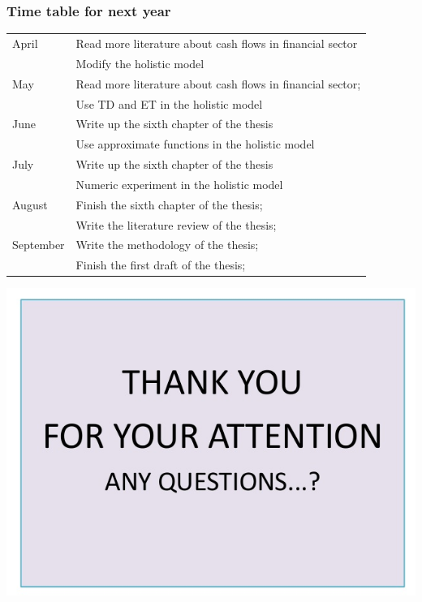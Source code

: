 \documentclass{beamer}
\begin{document}
\begin{frame}
\frametitle{Time table for next year}
\begin{table}

\centering
\begin{tabular}{| l | l |}
\hline

\hline
April & Read more literature about cash flows in financial sector\\
& Modify the holistic model\\
\hline
May & Read more literature about cash flows in financial sector;\\
& Use TD and ET in the holistic model\\
\hline
June & Write up the sixth chapter of the thesis\\
& Use approximate functions in the holistic model\\
\hline
July & Write up the sixth chapter of the thesis\\
& Numeric experiment in the holistic model\\
\hline
August & Finish the sixth chapter of the thesis;\\
& Write the literature review of the thesis;\\
\hline
September & Write the methodology of the thesis;\\
& Finish the first draft of the thesis;\\

\hline
\hline
\end{tabular}
\end{table}

\end{frame}

\begin{frame}
\includegraphics[scale=.4]{tky}
\end{frame}
\end{document}

